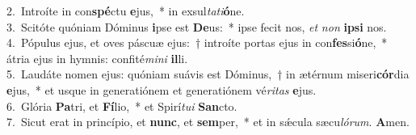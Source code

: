 {2.~}Introíte in con\textbf{spé}ctu \textbf{e}jus,~* in exsul\textit{ta}\textit{ti}\textbf{ó}ne.\\
{3.~}Scitóte quóniam Dóminus \textbf{i}pse est \textbf{De}us:~* ipse fecit nos, \textit{et} \textit{non} \textbf{i}\textbf{psi} nos.\\
{4.~}Pópulus ejus, et oves páscuæ ejus:~† introíte portas ejus in con\textbf{fes}si\textbf{ó}ne,~* átria ejus in hymnis: confité\textit{mi}\textit{ni} \textbf{il}li.\\
{5.~}Laudáte nomen ejus: quóniam suávis est Dóminus,~† in ætérnum miseri\textbf{cór}dia \textbf{e}jus,~* et usque in generatiónem et generatiónem vé\textit{ri}\textit{tas} \textbf{e}jus.\\
{6.~}Glória \textbf{Pa}tri, et \textbf{Fí}lio,~* et Spirí\textit{tu}\textit{i} \textbf{San}cto.\\
{7.~}Sicut erat in princípio, et \textbf{nunc}, et \textbf{sem}per,~* et in sǽcula sæcu\textit{ló}\textit{rum}. \textbf{A}men.\\
